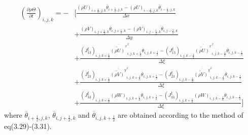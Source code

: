 \begin{align}
 \left(\frac{\partial \rho \Theta}{\partial t}\right)_{i,j,k}
 = - &\Bigg[ \frac{ (\rho U)_{i+\frac{1}{2},j,k} \overline{\theta}_{i+\frac{1}{2},j,k}
                  - (\rho U)_{i-\frac{1}{2},j,k} \overline{\theta}_{i-\frac{1}{2},j,k}
                  } {\Delta x} \nonumber \\
          &+ \frac{ (\rho V)_{i,j+\frac{1}{2},k} \overline{\theta}_{i,j+\frac{1}{2},k}
                  - (\rho V)_{i,j-\frac{1}{2},k} \overline{\theta}_{i,j-\frac{1}{2},k}
                  } {\Delta y} \nonumber \\
          &+ \frac{ (J^{\xi}_{13})_{i,j,k+\frac{1}{2}} \overline{\widetilde{(\rho U)}^x}^z_{i,j,k+\frac{1}{2}} \overline{\theta}_{i,j,k+\frac{1}{2}}
                  - (J^{\xi}_{13})_{i,j,k-\frac{1}{2}} \overline{\widetilde{(\rho U)}^x}^z_{i,j,k-\frac{1}{2}} \overline{\theta}_{i,j,k-\frac{1}{2}}
                  } {\Delta \xi} \nonumber \\
          &+ \frac{ (J^{\xi}_{23})_{i,j,k+\frac{1}{2}} \overline{\widetilde{(\rho V)}^y}^z_{i,j,k+\frac{1}{2}} \overline{\theta}_{i,j,k+\frac{1}{2}}
                  - (J^{\xi}_{23})_{i,j,k-\frac{1}{2}} \overline{\widetilde{(\rho V)}^y}^z_{i,j,k-\frac{1}{2}} \overline{\theta}_{i,j,k-\frac{1}{2}}
                  } {\Delta \xi} \nonumber \\
          &+ \frac{ (J^{\xi}_{33})_{i,j,k+\frac{1}{2}} (\rho W)_{i,j,k+\frac{1}{2}} \overline{\theta}_{i,j,k+\frac{1}{2}}
                  - (J^{\xi}_{33})_{i,j,k+\frac{1}{2}} (\rho W)_{i,j,k-\frac{1}{2}} \overline{\theta}_{i,j,k-\frac{1}{2}}
                  } {\Delta \xi} \Bigg]
\end{align}
where $\overline{\theta}_{i+\frac{1}{2},j,k}$, $\overline{\theta}_{i,j+\frac{1}{2},k}$ and 
$\overline{\theta}_{i,j,k+\frac{1}{2}}$ are obtained according to the method of eq(3.29)-(3.31).
